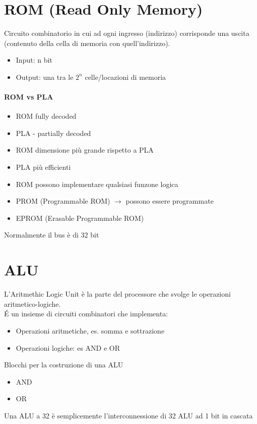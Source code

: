 \documentclass[12pt, a4paper, openany]{book}
\begin{document}
\section{ROM (Read Only Memory)}
Circuito combinatorio in cui ad ogni ingresso (indirizzo)
corrisponde una uscita (contenuto della cella di memoria con quell'indirizzo).
\begin{itemize}
    \item Input: n bit
    \item Output: una tra le $2^n$ celle/locazioni di memoria
\end{itemize}

\paragraph{ROM vs PLA}
\begin{itemize}
    \item ROM fully decoded
    \item PLA - partially decoded
    \item ROM dimensione più grande rispetto a PLA
    \item PLA più efficienti
    \item ROM possono implementare qualsiasi funzone logica
\end{itemize}

\begin{itemize}
    \item PROM (Programmable ROM) $\to$ possono essere programmate
    \item EPROM (Erasable Programmable ROM)
\end{itemize}

Normalmente il bus è di 32 bit

\section{ALU}
L'Aritmethic Logic Unit è la parte del processore che svolge le operazioni
aritmetico-logiche.
\\\'E un insieme di circuiti combinatori che implementa:
\begin{itemize}
    \item Operazioni aritmetiche, es. somma e sottrazione
    \item Operazioni logiche: es AND e OR
\end{itemize}
Blocchi per la costruzione di una ALU
\begin{itemize}
    \item AND
    \item OR
\end{itemize}
Una ALU a 32 è semplicemente l'interconnessione di 32 ALU ad 1 bit in cascata
\end{document}

